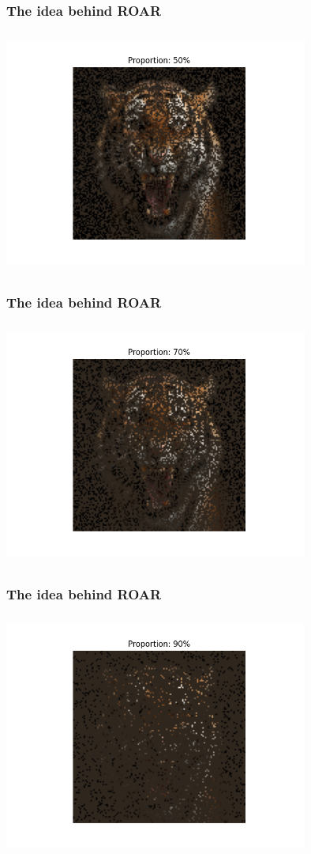 \documentclass{beamer}
\theoremstyle{mystyle}
\begin{document}
\begin{frame}
	\frametitle{The idea behind ROAR}
	\includegraphics[height=8cm, width=10cm]{tiger0.5.png}

\end{frame}

\begin{frame}
	\frametitle{The idea behind ROAR}
	\includegraphics[height=8cm, width=10cm]{tiger0.7.png}

\end{frame}


\begin{frame}
	\frametitle{The idea behind ROAR}
	\includegraphics[height=8cm, width=10cm]{tiger0.9.png}

\end{frame}
\end{document}
